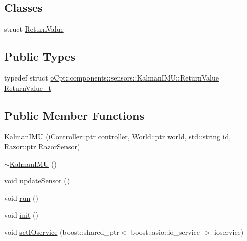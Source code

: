 \subsection*{Classes}
\begin{DoxyCompactItemize}
\item 
struct \hyperlink{structo_cpt_1_1components_1_1sensors_1_1_kalman_i_m_u_1_1_return_value}{Return\+Value}
\end{DoxyCompactItemize}
\subsection*{Public Types}
\begin{DoxyCompactItemize}
\item 
typedef struct \hyperlink{structo_cpt_1_1components_1_1sensors_1_1_kalman_i_m_u_1_1_return_value}{o\+Cpt\+::components\+::sensors\+::\+Kalman\+I\+M\+U\+::\+Return\+Value} \hyperlink{classo_cpt_1_1components_1_1sensors_1_1_kalman_i_m_u_aa6de0f4077440823dc976d8e4bb63add}{Return\+Value\+\_\+t}
\end{DoxyCompactItemize}
\subsection*{Public Member Functions}
\begin{DoxyCompactItemize}
\item 
\hyperlink{classo_cpt_1_1components_1_1sensors_1_1_kalman_i_m_u_a4f57989596976ac685dde219cc951ad8}{Kalman\+I\+MU} (\hyperlink{classo_cpt_1_1i_controller_a6d89a95cd6ad68bb74adfaca2f36370f}{i\+Controller\+::ptr} controller, \hyperlink{classo_cpt_1_1_world_aa6e591e3096d5de71e0cec9039663d67}{World\+::ptr} world, std\+::string id, \hyperlink{classo_cpt_1_1i_sensor_a03533d2c5dc66e332d70dbb3b5e3006a}{Razor\+::ptr} Razor\+Sensor)
\item 
\hyperlink{classo_cpt_1_1components_1_1sensors_1_1_kalman_i_m_u_af2b2dfb55ebe25288b84764acca55dfa}{$\sim$\+Kalman\+I\+MU} ()
\item 
void \hyperlink{classo_cpt_1_1components_1_1sensors_1_1_kalman_i_m_u_acc4f666db05d6355772a67ae2f06faef}{update\+Sensor} ()
\item 
void \hyperlink{classo_cpt_1_1components_1_1sensors_1_1_kalman_i_m_u_abd725cf96ffa29379c496bed243a520a}{run} ()
\item 
void \hyperlink{classo_cpt_1_1components_1_1sensors_1_1_kalman_i_m_u_a0d2dfbc9cc468e32f9c58f0a8c92c3ca}{init} ()
\item 
void \hyperlink{classo_cpt_1_1components_1_1sensors_1_1_kalman_i_m_u_a21cf83dfed3bd1c5a164bb847d25f426}{set\+I\+Oservice} (boost\+::shared\+\_\+ptr$<$ boost\+::asio\+::io\+\_\+service $>$ ioservice)
\end{DoxyCompactItemize}
